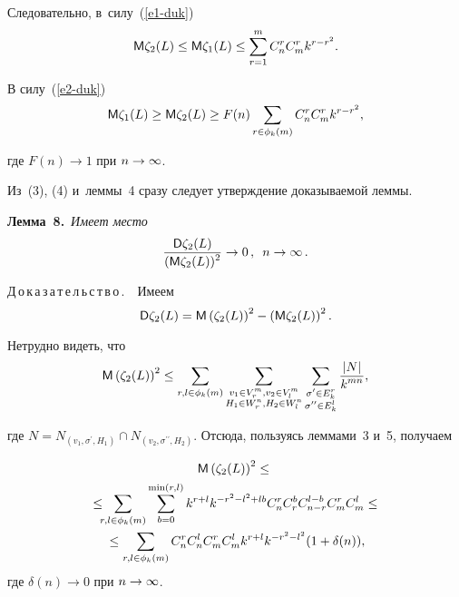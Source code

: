 \begin{multicols}{2}
 \noindent
  Следовательно, в~силу~(\ref{e1-duk})
  \begin{equation}
  {\sf M}\zeta_2(L)\leq {\sf M}\zeta_1(L)\leq \sum\limits^m_{r=1} C_n^r C_m^r k^{r-r^2}.
  \label{e3-duk}
  \end{equation}
  
   \vspace*{-2pt}
 
 \noindent
  В силу~(\ref{e2-duk})
  \begin{equation}
  {\sf M}\zeta_1(L)\geq {\sf M}\zeta_2(L)\geq F(n) \sum\limits_{r\in \phi_k(m)} C_n^r C_m^r 
k^{r-r^2},
  \label{e4-duk}
  \end{equation}
  
   \vspace*{-2pt}
 
 \noindent
где $F(n)\to 1$ при $n\hm\to \infty$.

  Из~(3), (4) и~леммы~4 сразу следует утверждение доказываемой леммы.
  
  \smallskip
  
  \noindent
  \textbf{Лемма~8.}\ \textit{Имеет место}
  $$
  \displaystyle\frac{\displaystyle {\sf D}\zeta_2(L)\mathstrut}{\displaystyle ({\sf M}\zeta_2(L))^2\mathstrut} \to 0\,,\enskip n\to \infty\,.
  $$
  
  \noindent
  Д\,о\,к\,а\,з\,а\,т\,е\,л\,ь\,с\,т\,в\,о\,.\ \ Имеем
\begin{equation}
{\sf D}\zeta_2(L) ={\sf M}\left( \zeta_2(L)\right)^2 -\left( {\sf M}\zeta_2(L)\right)^2.
\label{e5-duk}
\end{equation}
  
   \vspace*{-2pt}
 
 \noindent
  Нетрудно видеть, что
$$
{\sf M}\left(\zeta_2(L)\right)^2 \leq \sum\limits_{r,l\in \phi_k(m)} 
\sum\limits_{\substack{{v_1\in V_r^m, v_2\in V_l^m}\\ {H_1\in W_r^n, H_2\in W_l^n}}} 
\sum\limits_{\substack{{\sigma^\prime \in E_k^r}\\
{\sigma^{\prime\prime}\in E_k^l}}} \displaystyle\frac{\displaystyle \vert N\vert\mathstrut}{\displaystyle k^{mn}\mathstrut},
$$

 \vspace*{-2pt}
 
 \noindent
где $N=N_{(v_1,\sigma^\prime, H_1)}\cap N_{(v_2, \sigma^{\prime\prime}, 
H_2)}$. Отсюда, пользуясь леммами~3 и~5, получаем

\noindent
\begin{multline}
{\sf M}\left( \zeta_2(L)\right)^2 \leq{}\\
{}\leq\!\! \!\sum\limits_{r,l\in \phi_k(m)} 
\sum\limits_{b=0}^{\min(r,l)} k^{r+l} k^{-r^2-l^2+lb} C_n^r C_r^b C_{n-r}^{l-b} 
C_m^r C_m^l\leq{}\\
{}\leq \sum\limits_{r,l\in \phi_k(m)} C_n^r C_n^l C_m^r C_m^l k^{r+l} k^{-r^2-
l^2} (1+\delta(n)),
\label{e6-duk}
\end{multline}
где $\delta(n)\to 0$ при $n\hm\to \infty$.
  

\end{multicols}
